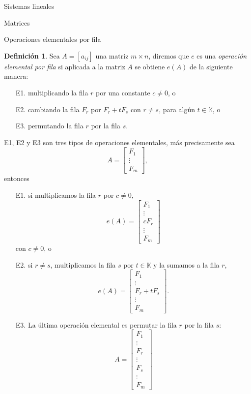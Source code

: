 \documentclass[a4paper,12pt,twoside,spanish]{amsbook}
\theoremstyle{definition}
\newtheorem{definicion}{Definici\'on}[section]
\theoremstyle{remark}
\newcommand{\K}{\mathbb K}
\begin{document}
\begin{chapter}{Sistemas lineales}
\begin{section}{Matrices}
\begin{subsection}{Operaciones elementales por fila}
				\begin{definicion}
					Sea $A = [a_{ij}]$ una matriz $m \times  n$, diremos que $e$ es una  \textit{operación elemental por fila} si aplicada a la matriz $A$ se obtiene  $e(A)$ de la siguiente manera:
					\begin{enumerate}
						\item[E1.]\label{elem-1} multiplicando la fila $r$ por una constante $c\not=0$, o
						\item[E2.]\label{elem-2} cambiando la fila $F_r$ por $F_r + tF_s$ con $r\not=s$, para algún $t \in \K$, o
						\item[E3.]\label{elem-3} permutando la fila $r$ por la fila $s$.   
					\end{enumerate}
					E1, E2 y E3 son tres tipos de operaciones elementales, más precisamente sea 
					\begin{equation*}
					A = \begin{bmatrix} 
					F_1 \\  \vdots \\	F_m
					\end{bmatrix},
					\end{equation*} entonces 
					\begin{enumerate}
						\item[E1.] si multiplicamos la fila $r$ por $c \not=0$, 
						$$ e(A) = \begin{bmatrix} 
						F_1 \\ 	\vdots \\ cF_r \\ \vdots \\	F_m
						\end{bmatrix} $$ con $c \not=0$, o
						\item[E2.] si $r\not=s$, multiplicamos la fila $s$ por  $t \in \K$ y la sumamos a la fila $r$, 
						$$ e(A)= \begin{bmatrix} 
						F_1 \\  \vdots \\ F_r + t F_s\\ \vdots \\	F_m
						\end{bmatrix}.$$
						\item[E3.] La última operación elemental es  permutar la fila $r$ por la fila $s$:
						$$
						A= \begin{bmatrix} 
						F_1 \\ 	\vdots \\ F_r \\ \vdots \\ F_s\\ \vdots \\	F_m

\end{bmatrix}$$
\end{enumerate}
\end{definicion}
\end{subsection}
\end{section}
\end{chapter}
\end{document}

